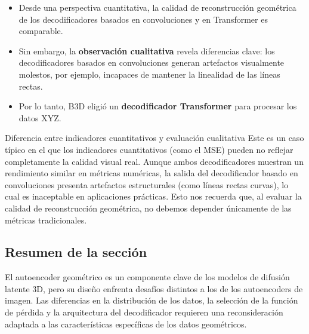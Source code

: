 \begin{itemize}
    \item Desde una perspectiva cuantitativa, la calidad de reconstrucción geométrica de los decodificadores basados en convoluciones y en Transformer es comparable.
    \item Sin embargo, la \textbf{observación cualitativa} revela diferencias clave: los decodificadores basados en convoluciones generan artefactos visualmente molestos, por ejemplo, incapaces de mantener la linealidad de las líneas rectas.
    \item Por lo tanto, B3D eligió un \textbf{decodificador Transformer} para procesar los datos XYZ.
\end{itemize}

\begin{warningbox}{Diferencia entre indicadores cuantitativos y evaluación cualitativa}
Este es un caso típico en el que los indicadores cuantitativos (como el MSE) pueden no reflejar completamente la calidad visual real. Aunque ambos decodificadores muestran un rendimiento similar en métricas numéricas, la salida del decodificador basado en convoluciones presenta artefactos estructurales (como líneas rectas curvas), lo cual es inaceptable en aplicaciones prácticas. Esto nos recuerda que, al evaluar la calidad de reconstrucción geométrica, no debemos depender únicamente de las métricas tradicionales.
\end{warningbox}

\subsection{Resumen de la sección}

El autoencoder geométrico es un componente clave de los modelos de difusión latente 3D, pero su diseño enfrenta desafíos distintos a los de los autoencoders de imagen. Las diferencias en la distribución de los datos, la selección de la función de pérdida y la arquitectura del decodificador requieren una reconsideración adaptada a las características específicas de los datos geométricos.
